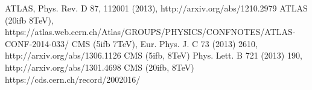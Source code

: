

    ATLAS, Phys. Rev. D 87, 112001 (2013), http://arxiv.org/abs/1210.2979
	ATLAS (20ifb 8TeV), https://atlas.web.cern.ch/Atlas/GROUPS/PHYSICS/CONFNOTES/ATLAS-CONF-2014-033/ 
	CMS (5ifb 7TeV), Eur. Phys. J. C 73 (2013) 2610, http://arxiv.org/abs/1306.1126
	CMS (5ifb, 8TeV) Phys. Lett. B 721 (2013) 190, http://arxiv.org/abs/1301.4698
	CMS (20ifb, 8TeV) https://cds.cern.ch/record/2002016/

















